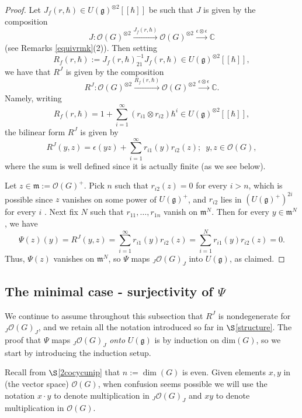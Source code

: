 \documentclass{amsart}
\numberwithin{equation}{section}
\theoremstyle{definition}
\begin{document}
\begin{proof} 
Let $J_f(r,\hbar)\in U(\mathfrak{g})^{\otimes 2}[[\hbar ]]$ be such that $J$ is given by the composition
\begin{equation}\label{univforJ}
J:\mathcal{O}(G)^{\otimes 2}\xrightarrow{J_f(r,\hbar)}\mathcal{O}(G)^{\otimes 2}\xrightarrow{\epsilon\otimes \epsilon}\mathbb{C}
\end{equation}
(see Remarks \ref{equivrmk}(2)). Then setting 
$$R_f(r,\hbar):=J_f(r,\hbar)_{21}^{-1}J_f(r,\hbar)\in U(\mathfrak{g})^{\otimes 2}[[\hbar ]],$$ we have that $R^J$ is given by the composition
$$R^J:\mathcal{O}(G)^{\otimes 2}\xrightarrow{R_f(r,\hbar)}\mathcal{O}(G)^{\otimes 2}\xrightarrow{\epsilon\otimes \epsilon}\mathbb{C}.$$ 
Namely, writing
$$
R_f(r,\hbar)=1+\sum_{i=1}^{\infty} (r_{i1}\otimes r_{i2})\hbar ^i\in U(\mathfrak{g})^{\otimes 2}[[\hbar ]],$$ the bilinear form $R^J$ is given by
$$
R^J(y,z)=\epsilon(yz)+\sum_{i=1}^{\infty} r_{i1}(y)r_{i2}(z);\,\,\,y,z\in \mathcal{O}(G),
$$
where the sum is well defined since it is actually finite (as we see below).

Let $z \in \mathfrak{m}:=\mathcal{O}(G)^+$. Pick $n$ such that $r_{i2}(z)=0$ for every $i>n$, which is possible since $z$ vanishes on some power of $U(\mathfrak{g})^+$, and $r_{i2}$ lies in $(U(\mathfrak{g})^+)^{2i}$ for every $i$ \cite[Example 5.3]{EG1}. Next fix $N$ such that $r_{11},\dots,r_{1n}$ vanish on 
$\mathfrak{m}^N$. Then for every $y\in\mathfrak{m}^N$, we have
$$
\Psi (z)(y)=R^J(y,z) =\sum_{i=1}^{\infty} r_{i1}(y)r_{i2}(z)=\sum_{i=1}^{N}r_{i1}(y)r_{i2}(z) = 0.
$$
Thus, $\Psi(z)$ vanishes on $\mathfrak{m}^N$, so $\Psi$ maps ${}_J\mathcal{O}(G)_{J}$ into $U(\mathfrak{g})$, as claimed.
\end{proof}

\subsection{The minimal case - surjectivity of $\Psi$}\label{minimal2}

We continue to assume throughout this subsection that $R^J$ is nondegenerate for ${}_J\mathcal{O}(G)_J$, and we retain all the notation introduced so far in $\S$\ref{structure}. The proof that $\Psi$ maps ${}_J\mathcal{O}(G)_J$ {\em onto} $U(\mathfrak{g})$ is by induction on $\mathrm{dim}(G)$, so we start by introducing the induction setup. 

Recall from $\S$\ref{2cocycunip} that $n:=\dim(G)$ is even. Given elements $x,y$ in (the vector space) $\mathcal{O}(G)$, when confusion seems possible we will use the notation $x\cdot y$ to denote multiplication in ${}_J\mathcal{O}(G)_J$ and $xy$ to denote multiplication in $\mathcal{O}(G)$.
\end{document}
